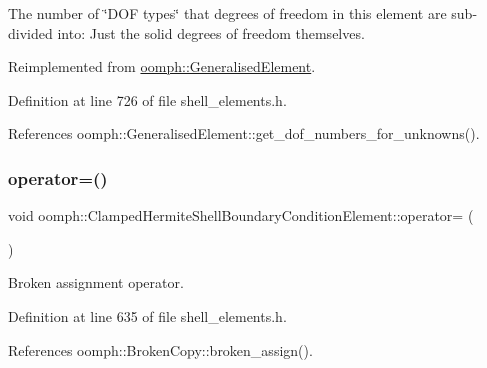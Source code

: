 The number of \char`\"{}\+D\+O\+F types\char`\"{} that degrees of freedom in this element are sub-\/divided into\+: Just the solid degrees of freedom themselves. 



Reimplemented from \hyperlink{classoomph_1_1GeneralisedElement_a0c6037a870597b35dcf1c780710b9a56}{oomph\+::\+Generalised\+Element}.



Definition at line 726 of file shell\+\_\+elements.\+h.



References oomph\+::\+Generalised\+Element\+::get\+\_\+dof\+\_\+numbers\+\_\+for\+\_\+unknowns().

\mbox{\label{classoomph_1_1ClampedHermiteShellBoundaryConditionElement_af5081c0ce57fedef78e6dc2359ea3a1d}} 
\subsubsection{\texorpdfstring{operator=()}{operator=()}}
{\footnotesize\ttfamily void oomph\+::\+Clamped\+Hermite\+Shell\+Boundary\+Condition\+Element\+::operator= (\begin{DoxyParamCaption}\item[{const \hyperlink{classoomph_1_1ClampedHermiteShellBoundaryConditionElement}{Clamped\+Hermite\+Shell\+Boundary\+Condition\+Element} \&}]{ }\end{DoxyParamCaption})\hspace{0.3cm}{\ttfamily [inline]}}



Broken assignment operator. 



Definition at line 635 of file shell\+\_\+elements.\+h.



References oomph\+::\+Broken\+Copy\+::broken\+\_\+assign().

\mbox{\label{classoomph_1_1ClampedHermiteShellBoundaryConditionElement_a1595e604991ff18f4d907da5a8fdf40b}} 
